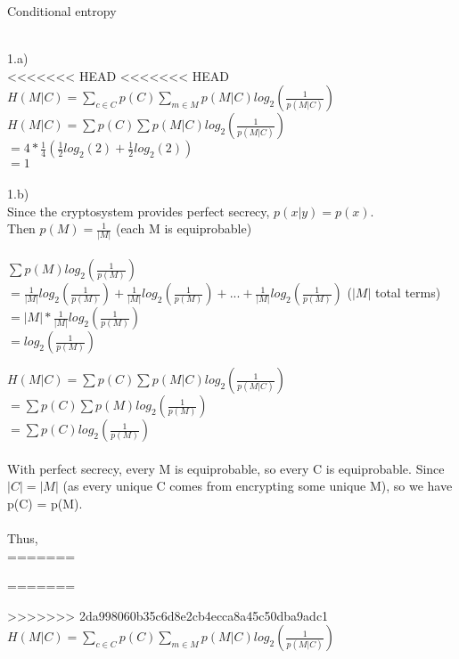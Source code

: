 \documentclass{assignment}
\newcommand\tab[1][0.5cm]{\hspace*{#1}}
\begin{document}
\begin{problemlist}
\pbitem Conditional entropy
\begin{problem}
\begin{answer}
\\
1.a)\\
<<<<<<< HEAD
<<<<<<< HEAD
$H(M|C)=\sum_{c\in C}p(C)\sum_{m\in M}p(M|C)log_2(\frac{1}{p(M|C)})$\\
$H(M|C)=\sum p(C)\sum p(M|C)log_2(\frac{1}{p(M|C)})$\\
$=4*\frac{1}{4}(\frac{1}{2}log_2(2)+ \frac{1}{2}log_2(2))$\\
$=1$\\
\\
1.b)\\
Since the cryptosystem provides perfect secrecy, $p(x|y)=p(x)$.\\
Then $p(M) = \frac{1}{|M|}$ (each M is equiprobable)\\
\\
$\sum p(M)log_2(\frac{1}{p(M)})$\\
\tab$=\frac{1}{|M|}log_2(\frac{1}{p(M)})+\frac{1}{|M|}log_2(\frac{1}{p(M)})+...+\frac{1}{|M|}log_2(\frac{1}{p(M)})$  ($|M|$ total terms)\\
\tab$=|M|*\frac{1}{|M|}log_2(\frac{1}{p(M)})$ \\
\tab$=log_2(\frac{1}{p(M)})$ 

$H(M|C)=\sum p(C)\sum p(M|C)log_2(\frac{1}{p(M|C)})$\\
$=\sum p(C)\sum p(M)log_2(\frac{1}{p(M)})$\\
$=\sum p(C)log_2(\frac{1}{p(M)})$\\
\\
With perfect secrecy, every M is equiprobable, so every C is equiprobable.
Since $|C| = |M|$  (as every unique C comes from encrypting some unique M), so we have
p(C) = p(M).\\
\\
Thus,\\
=======

=======

>>>>>>> 2da998060b35c6d8e2cb4ecca8a45c50dba9adc1
$H(M|C)=\sum_{c\in C}p(C)\sum_{m\in M}p(M|C)log_2(\frac{1}{p(M|C)})$\\


\end{answer}
\end{problem}
\end{problemlist}
\end{document}

